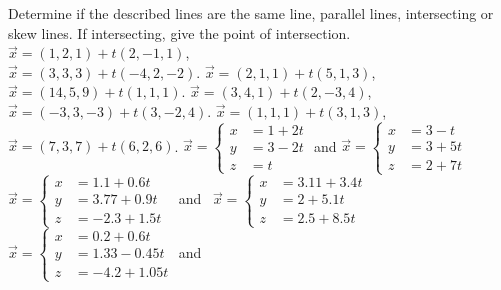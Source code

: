 
\begin{Exercise}[
name={},
title={}, 
difficulty=0,
origin={\cite{GHC}}]
Determine if the described lines are the same line, parallel lines, intersecting or skew lines. If intersecting, give the point of intersection.
\Question $\vec x = (1,2,1) + t(2,-1,1)$,\\
$\vec x = (3,3,3) + t(-4,2,-2)$.
\Question $\vec x = (2,1,1) + t(5,1,3)$,\\
$\vec x = (14,5,9) + t(1,1,1)$.
\Question $\vec x = (3,4,1) + t(2,-3,4)$,\\
$\vec x = (-3,3,-3) + t(3,-2,4)$.
\Question $\vec x = (1,1,1) + t(3,1,3)$,\\
$\vec x = (7,3,7) + t(6,2,6)$.
\Question $\vec x = \left\{\begin{aligned} x&= 1+2t\\ y&= 3-2t\\ z&= t\end{aligned}\right.$ \quad and \quad
$\vec x = \left\{\begin{aligned} x&= 3-t\\ y&= 3+5t\\ z&= 2+7t\end{aligned}\right.$
\Question $\vec x = \left\{\begin{aligned} x&= 1.1+0.6t\\ y&= 3.77+0.9t\\ z&= -2.3+1.5t\end{aligned}\right.$ \ and \ 
$\vec x = \left\{\begin{aligned} x&= 3.11+3.4t\\ y&= 2+5.1t\\ z&= 2.5+8.5t\end{aligned}\right.$
\Question $\vec x = \left\{\begin{aligned} x&= 0.2+0.6t\\ y&= 1.33-0.45t\\ z&= -4.2+1.05t\end{aligned}\right.$ and 

\end{Exercise}
